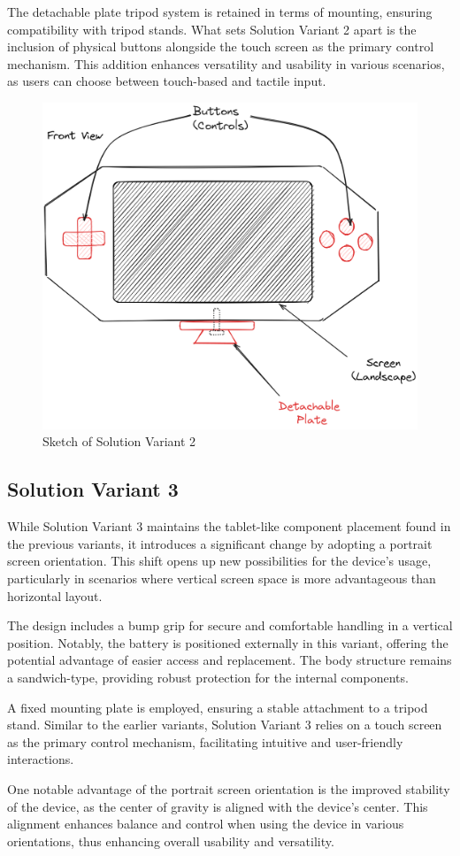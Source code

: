 The detachable plate tripod system is retained in terms of mounting, ensuring compatibility with tripod stands. What sets Solution Variant 2 apart is the inclusion of physical buttons alongside the touch screen as the primary control mechanism. This addition enhances versatility and usability in various scenarios, as users can choose between touch-based and tactile input.

\begin{figure}[H]
    \centering
    \includegraphics[width=0.55\linewidth]{texs/Part1/chapter3/image/v2.png}
    \caption{Sketch of Solution Variant 2}
    \label{fig:sketch-solution-variant-2}
\end{figure}

\subsection{Solution Variant 3}
While Solution Variant 3 maintains the tablet-like component placement found in the previous variants, it introduces a significant change by adopting a portrait screen orientation. This shift opens up new possibilities for the device's usage, particularly in scenarios where vertical screen space is more advantageous than horizontal layout.

The design includes a bump grip for secure and comfortable handling in a vertical position. Notably, the battery is positioned externally in this variant, offering the potential advantage of easier access and replacement. The body structure remains a sandwich-type, providing robust protection for the internal components.

A fixed mounting plate is employed, ensuring a stable attachment to a tripod stand. Similar to the earlier variants, Solution Variant 3 relies on a touch screen as the primary control mechanism, facilitating intuitive and user-friendly interactions.

One notable advantage of the portrait screen orientation is the improved stability of the device, as the center of gravity is aligned with the device's center. This alignment enhances balance and control when using the device in various orientations, thus enhancing overall usability and versatility.

